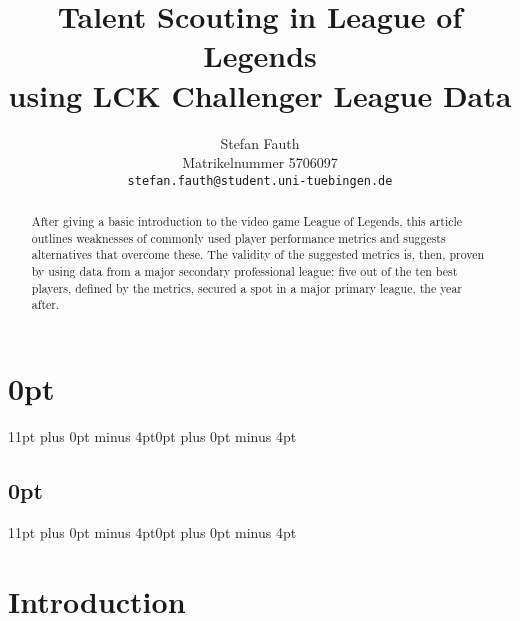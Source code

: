 \documentclass{article}
\title{Talent Scouting in League of Legends \\ using LCK Challenger League Data}
\author{%
  Stefan Fauth\\
  Matrikelnummer 5706097\\
  \texttt{stefan.fauth@student.uni-tuebingen.de}
}
\begin{document}
\maketitle

\titlespacing\section{0pt}{11pt plus 0pt minus 4pt}{0pt plus 0pt minus 4pt}
\titlespacing\subsection{0pt}{11pt plus 0pt minus 4pt}{0pt plus 0pt minus 4pt}


\begin{abstract}
After giving a basic introduction to the video game League of Legends, this article outlines weaknesses of commonly used player performance metrics and suggests alternatives that overcome these. The validity of the suggested metrics is, then, proven by using data from a major secondary professional league: five out of the ten best players, defined by the metrics, secured a spot in a major primary league, the year after. 
\end{abstract}

\section{Introduction}
\end{document}
